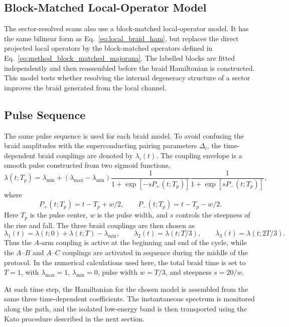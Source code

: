 \subsection{Block-Matched Local-Operator Model}
The sector-resolved scans also use a block-matched local-operator model. It has the same bilinear form as Eq.~\ref{eq:local_braid_ham}, but replaces the direct projected local operators by the block-matched operators defined in Eq.~\ref{eq:method_block_matched_majorana}. The labelled blocks are fitted independently and then reassembled before the braid Hamiltonian is constructed. This model tests whether resolving the internal degeneracy structure of a sector improves the braid generated from the local channel.

\subsection{Pulse Sequence}
The same pulse sequence is used for each braid model. To avoid confusing the braid amplitudes with the superconducting pairing parameters $\Delta_i$, the time-dependent braid couplings are denoted by $\lambda_i(t)$. The coupling envelope is a smooth pulse constructed from two sigmoid functions,
\begin{equation}
\lambda(t;T_p)
=
\lambda_{\min}
+
(\lambda_{\max}-\lambda_{\min})
\frac{1}{1+\exp[-sP_+(t;T_p)]}
\frac{1}{1+\exp[sP_-(t;T_p)]},
\label{eq:method_lambda_pulse}
\end{equation}
where
\begin{equation}
P_+(t;T_p) = t-T_p+w/2,
\qquad
P_-(t;T_p) = t-T_p-w/2.
\end{equation}
Here $T_p$ is the pulse center, $w$ is the pulse width, and $s$ controls the steepness of the rise and fall. The three braid couplings are then chosen as
\begin{equation}
\lambda_1(t)
=
\lambda(t;0)+\lambda(t;T)-\lambda_{\min},
\qquad
\lambda_2(t)
=
\lambda(t;T/3),
\qquad
\lambda_3(t)
=
\lambda(t;2T/3).
\label{eq:method_braid_pulses}
\end{equation}
Thus the $A$-arm coupling is active at the beginning and end of the cycle, while the $A$--$B$ and $A$--$C$ couplings are activated in sequence during the middle of the protocol. In the numerical calculations used here, the total braid time is set to $T=1$, with $\lambda_{\max}=1$, $\lambda_{\min}=0$, pulse width $w=T/3$, and steepness $s=20/w$.

At each time step, the Hamiltonian for the chosen model is assembled from the same three time-dependent coefficients. The instantaneous spectrum is monitored along the path, and the isolated low-energy band is then transported using the Kato procedure described in the next section.

